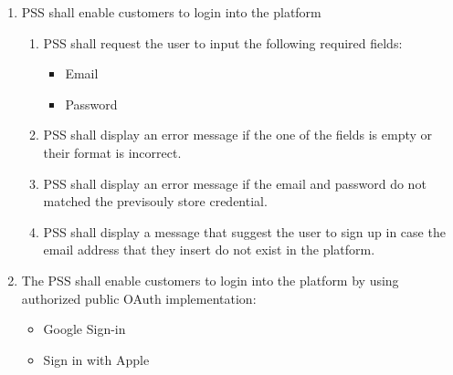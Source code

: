 \begin{enumerate}[label=SY-\arabic*]
    \item PSS shall enable customers to login into the platform 
    \begin{enumerate}[label=SY3-\arabic*]
        \item PSS shall request the user to input the following required 
        fields:
        \begin{itemize}
            \item Email
            \item Password
        \end{itemize}
        \item PSS shall display an error message if the one of the fields is 
        empty or their format is incorrect.
        \item PSS shall display an error message if the email and password 
        do not matched the previsouly store credential.
        \item PSS shall display a message that suggest the user to sign up
        in case the email address that they insert do not exist in the 
        platform.
    \end{enumerate}
    \item The PSS shall enable customers to login into the platform by using 
    authorized public OAuth implementation:
    \begin{itemize}
        \item Google Sign-in \cite{google-sign-in}
        \item Sign in with Apple \cite{sign-in-with-apple}
    \end{itemize}


\end{enumerate}
